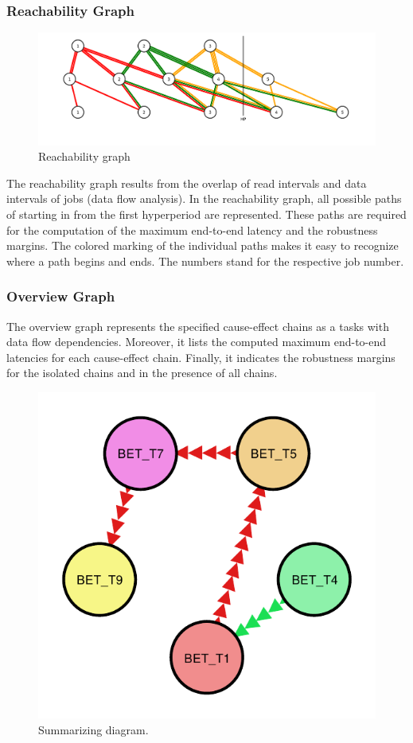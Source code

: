 \newpage
\subsubsection{Reachability Graph}
%
\begin{figure}[H]
		\centering
		\includegraphics[width=400pt]{fig/tree.pdf}
		\caption{Reachability graph}
		\label{fig:reachability}
\end{figure}
%
The reachability graph results from the overlap of read intervals and data intervals of jobs (data flow analysis). 
In the reachability graph, all possible paths of starting in from the first hyperperiod are represented.
These paths are required for the computation of the maximum end-to-end latency and the robustness margins. 
The colored marking of the individual paths makes it easy to recognize where a path begins and ends. The numbers stand for the respective job number. 
    

\newpage
\subsubsection{Overview Graph}
The overview graph represents the specified cause-effect chains as a tasks with data flow dependencies.
Moreover, it lists the computed maximum end-to-end latencies for each cause-effect chain.
Finally, it indicates the robustness margins for the isolated chains and in the presence of all chains.
%
\begin{figure}[H]
  \centering
  \includegraphics[width=400pt]{fig/results.pdf}
  \caption{Summarizing diagram.}
  \label{fig:summ_diagram}
\end{figure}
